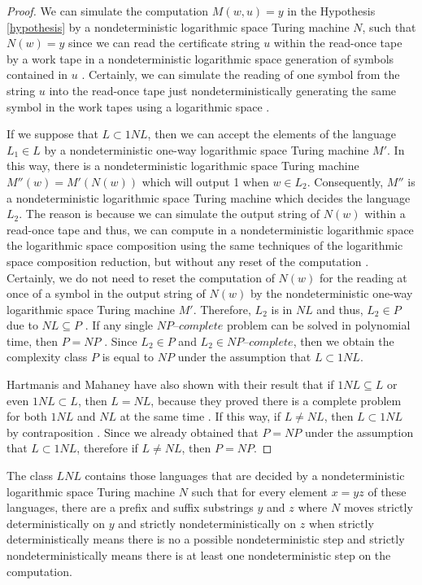 \documentclass[a4paper,UKenglish,cleveref, autoref]{lipics-v2019}
\begin{document}
\begin{proof}
We can simulate the computation $M(w, u) = y$ in the Hypothesis \ref{hypothesis} by a nondeterministic logarithmic space Turing machine $N$, such that $N(w) = y$ since we can read the certificate string $u$ within the read-once tape by a work tape in a nondeterministic logarithmic space generation of symbols contained in $u$ \cite{Pap03}. Certainly, we can simulate the reading of one symbol from the string $u$ into the read-once tape just nondeterministically generating the same symbol in the work tapes using a logarithmic space \cite{Pap03}.

If we suppose that $L \subset 1NL$, then we can accept the elements of the language $L_{1} \in L$ by a nondeterministic one-way logarithmic space Turing machine $M'$. In this way, there is a nondeterministic logarithmic space Turing machine $M''(w) = M'(N(w))$ which will output 1 when $w \in L_{2}$. Consequently, $M''$ is a nondeterministic logarithmic space Turing machine which decides the language $L_{2}$. The reason is because we can simulate the output string of $N(w)$ within a read-once tape and thus, we can compute in a nondeterministic logarithmic space the logarithmic space composition using the same techniques of the logarithmic space composition reduction, but without any reset of the computation \cite{Pap03}. Certainly, we do not need to reset the computation of $N(w)$ for the reading at once of a symbol in the output string of $N(w)$ by the nondeterministic one-way logarithmic space Turing machine $M'$. Therefore, $L_{2}$ is in $NL$ and thus, $L_{2} \in P$ due to $NL \subseteq P$ \cite{Pap03}. If any single $\textit{NP--complete}$ problem can be solved in polynomial time, then $P = NP$ \cite{CLRS01}. Since $L_{2} \in P$ and $L_{2} \in \textit{NP--complete}$, then we obtain the complexity class $P$ is equal to $NP$ under the assumption that $L \subset 1NL$.

Hartmanis and Mahaney have also shown with their result that if $1NL \subseteq L$ or even $1NL \subset L$, then $L=NL$, because they proved there is a complete problem for both $1NL$ and $NL$ at the same time \cite{HM81}. If this way, if $L \neq NL$, then $L \subset 1NL$ by contraposition \cite{Pap03}. Since we already obtained that $P = NP$ under the assumption that $L \subset 1NL$, therefore if $L \neq NL$, then $P = NP$.
\end{proof}

\begin{definition}
\label{definition}
The class $LNL$ contains those languages that are decided by a nondeterministic logarithmic space Turing machine $N$ such that for every element $x = yz$ of these languages, there are a prefix and suffix substrings $y$ and $z$ where $N$ moves strictly deterministically on $y$ and strictly nondeterministically on $z$ when strictly deterministically means there is no a possible nondeterministic step and strictly nondeterministically means there is at least one nondeterministic step on the computation.
\end{definition}
\end{document}
